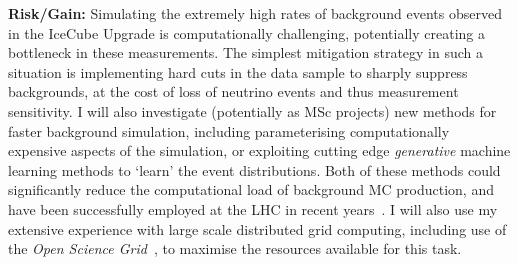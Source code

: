 \documentclass[a4paper,11pt]{article}
\begin{document}






\textbf{Risk/Gain:} Simulating the extremely high rates of background events observed in the IceCube Upgrade is computationally challenging, potentially creating a bottleneck in these measurements. The simplest mitigation strategy in such a situation is implementing hard cuts in the data sample to sharply suppress backgrounds, at the cost of loss of neutrino events and thus measurement sensitivity. I will also investigate (potentially as MSc projects) new methods for faster background simulation, including parameterising computationally expensive aspects of the simulation, or exploiting cutting edge \textit{generative} machine learning methods to `learn' the event distributions. Both of these methods could significantly reduce the computational load of background MC production, and have been successfully employed at the LHC in recent years~\cite{Barberio:2009zza, ATLAS:2010bfa, Paganini:2017hrr}. I will also use my extensive experience with large scale distributed grid computing, including use of the \textit{Open Science Grid}~\cite{osg07, osg09}, to maximise the resources available for this task. \\
\end{document}
